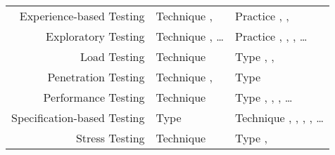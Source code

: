 \begin{paperTable}
\begin{minipage}{\linewidth}
\begin{tabular}{|r|l|l|}
            Experience-based Testing    & Technique \cite[pp.~46, 50]{Firesmith2015}, \cite[Fig.~2]{IEEE2022} & Practice \cite[Fig.~2]{IEEE2022}, \cite[p.~viii]{IEEE2021c}, \cite[pp.~iii, 31, 33]{IEEE2013}                \\
            Exploratory Testing         & Technique \cite[pp.~5\=/13 to 5\=/14]{SWEBOK2025}, \dots{}          & Practice \cite[pp.~11, 20, 34, Fig.~2]{IEEE2022}, \cite[p.~viii]{IEEE2021c}, \cite[p.~5]{IEEE2021a}, \dots{} \\ %
            Load Testing                & Technique \cite[pp.~38\==39]{IEEE2021c}                             & Type \cite[p.~253]{IEEE2017}, \cite[pp.~5, 20, 22]{IEEE2022}, \cite{ISTQB}                                   \\
            Penetration Testing         & Technique \cite[p.~40]{IEEE2021c}, \cite{ISTQB}                     & Type \cite[pp.~41, 43]{IEEE2021b}                                                                            \\
            Performance Testing         & Technique \cite[pp.~38\==39]{IEEE2021c}                             & Type \cite[pp.~7, 22, 26\==27]{IEEE2022}, \cite[p.~7]{IEEE2021c}, \cite[pp.~2, 8]{IEEE2021a}, \dots{}        \\ %
            Specification-based Testing & Type \cite{ISTQB}                                                   & Technique \cite[p. 22]{IEEE2022}, \cite{ISTQB}, \cite[p.~8]{IEEE2021c}, \cite[p.~45]{IEEE2021b}, \dots{}     \\ %
            Stress Testing              & Technique \cite[pp.~38\==39]{IEEE2021c}                             & Type \cite[p.~442]{IEEE2017}, \cite[pp.~9, 22]{IEEE2022}                                                     \\
            \hline
        \end{tabular}
    \end{minipage}
\end{paperTable}
